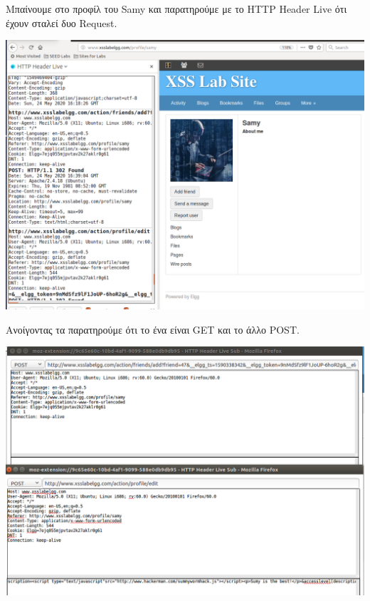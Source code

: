 \noindent
Μπαίνουμε στο προφίλ του Samy και παρατηρούμε με το HTTP Header Live ότι
έχουν σταλεί δυο Request.
\begin{center}
			\includegraphics[width=1\textwidth]{image/6.3.PNG}		
\end{center}
\noindent 
Ανοίγοντας τα παρατηρούμε ότι το ένα είναι GET και το άλλο POST.

\begin{center}
			\includegraphics[width=1\textwidth]{image/6.4.PNG}		
\end{center}

